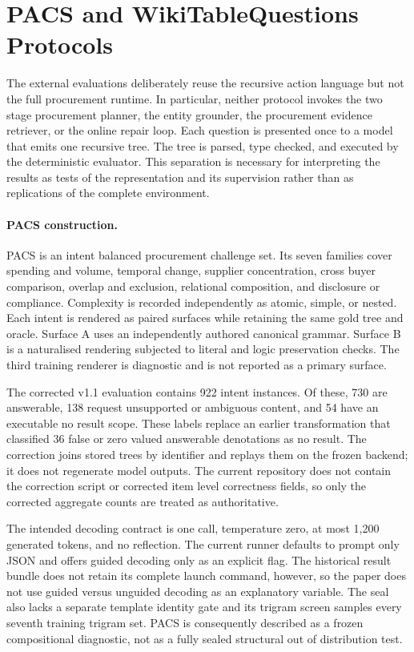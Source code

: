 \documentclass{article}
\begin{document}
\section{PACS and WikiTableQuestions Protocols}
\label{app:external-protocols}

The external evaluations deliberately reuse the recursive action language but not the full
procurement runtime.  In particular, neither protocol invokes the two stage procurement planner,
the entity grounder, the procurement evidence retriever, or the online repair loop.  Each question
is presented once to a model that emits one recursive tree.  The tree is parsed, type checked, and
executed by the deterministic evaluator.  This separation is necessary for interpreting the
results as tests of the representation and its supervision rather than as replications of the
complete environment.

\paragraph{PACS construction.}
PACS is an intent balanced procurement challenge set.  Its seven families cover spending and
volume, temporal change, supplier concentration, cross buyer comparison, overlap and exclusion,
relational composition, and disclosure or compliance.  Complexity is recorded independently as
atomic, simple, or nested.  Each intent is rendered as paired surfaces while retaining the same
gold tree and oracle.  Surface A uses an independently authored canonical grammar.  Surface B is a
naturalised rendering subjected to literal and logic preservation checks.  The third training
renderer is diagnostic and is not reported as a primary surface.

The corrected v1.1 evaluation contains 922 intent instances.  Of these, 730 are answerable, 138
request unsupported or ambiguous content, and 54 have an executable no result scope.  These labels
replace an earlier transformation that classified 36 false or zero valued answerable denotations as
no result.  The correction joins stored trees by identifier and replays them on the frozen backend;
it does not regenerate model outputs.  The current repository does not contain the correction script
or corrected item level correctness fields, so only the corrected aggregate counts are treated as
authoritative.

The intended decoding contract is one call, temperature zero, at most 1,200 generated tokens, and
no reflection.  The current runner defaults to prompt only JSON and offers guided decoding only as
an explicit flag.  The historical result bundle does not retain its complete launch command,
however, so the paper does not use guided versus unguided decoding as an explanatory variable.  The
seal also lacks a separate template identity gate and its trigram screen samples every seventh
training trigram set.  PACS is consequently described as a frozen compositional diagnostic, not as
a fully sealed structural out of distribution test.
\end{document}
